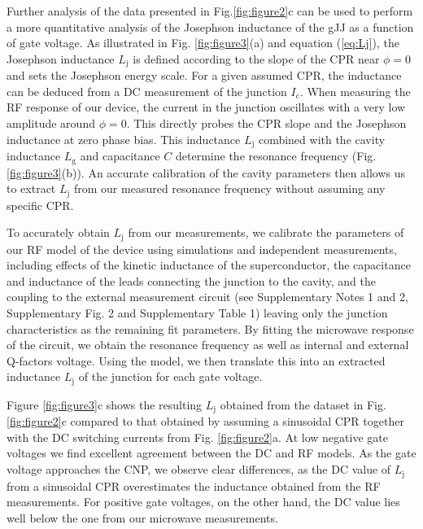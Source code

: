 Further analysis of the data presented in Fig.\ref{fig:figure2}c can be used to perform a more quantitative analysis of the Josephson inductance of the gJJ as a function of gate voltage.
As illustrated in Fig. \ref{fig:figure3}(a) and equation (\ref{eq:Lj}), the Josephson inductance $L_\text{j}$ is defined according to the slope of the CPR near $\phi=0$ and sets the Josephson energy scale.
For a given assumed CPR, the inductance can be deduced from a DC measurement of the junction $I_\text{c}$.
When measuring the RF response of our device, the current in the junction oscillates with a very low amplitude around $\phi=0$.
This directly probes the CPR slope and the Josephson inductance at zero phase bias.
This inductance $L_\text{j}$ combined with the cavity inductance $L_\text{g}$ and capacitance $C$ determine the resonance frequency (Fig. \ref{fig:figure3}(b)).
An accurate calibration of the cavity parameters then allows us to extract $L_\text{j}$ from our measured resonance frequency without assuming any specific CPR.

To accurately obtain $L_\text{j}$ from our measurements, we calibrate the parameters of our RF model of the device using simulations and independent measurements, including effects of the kinetic inductance of the superconductor, the capacitance and inductance of the leads connecting the junction to the cavity, and the coupling to the external measurement circuit (see Supplementary Notes 1 and 2, Supplementary Fig. 2 and Supplementary Table 1) leaving only the junction characteristics as the remaining fit parameters.
By fitting the microwave response of the circuit, we obtain the resonance frequency as well as internal and external Q-factors voltage.
Using the model, we then translate this into an extracted inductance $L_\text{j}$ of the junction for each gate voltage.

Figure \ref{fig:figure3}c shows the resulting $L_\text{j}$ obtained from the dataset in Fig. \ref{fig:figure2}c compared to that obtained by assuming a sinusoidal CPR together with the DC switching currents from Fig. \ref{fig:figure2}a.
At low negative gate voltages we find excellent agreement between the DC and RF models.
As the gate voltage approaches the CNP, we observe clear differences, as the DC value of $L_\text{j}$ from a sinusoidal CPR overestimates the inductance obtained from the RF measurements.
For positive gate voltages, on the other hand, the DC value lies well below the one from our microwave measurements.

